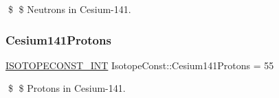 \$ \$ Neutrons in Cesium-\/141. \mbox{\label{group___isotope_const-_cesium-_cs141_ga81450dbf4d01521ea78da0323074bd64}} 
\subsubsection{\texorpdfstring{Cesium141\+Protons}{Cesium141Protons}}
{\footnotesize\ttfamily \mbox{\hyperlink{group___isotope_const-_macros_ga5f18360b3e99483a35c32d789e62621c}{I\+S\+O\+T\+O\+P\+E\+C\+O\+N\+S\+T\+\_\+\+I\+NT}} Isotope\+Const\+::\+Cesium141\+Protons = 55}

\$ \$ Protons in Cesium-\/141. 